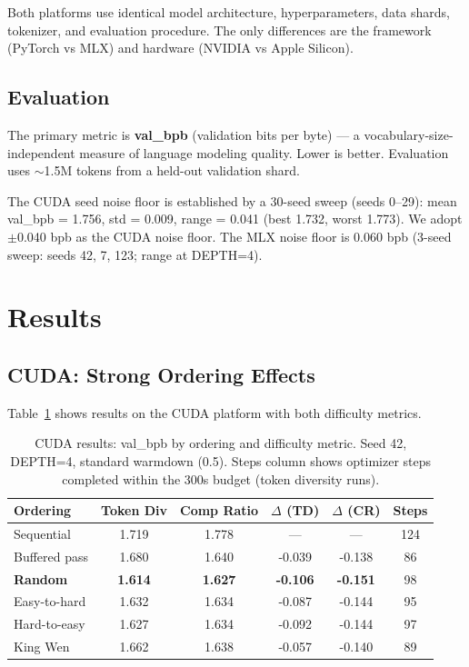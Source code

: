 \documentclass{article}
\begin{document}
Both platforms use identical model architecture, hyperparameters,
data shards, tokenizer, and evaluation procedure. The only differences
are the framework (PyTorch vs MLX) and hardware (NVIDIA vs Apple Silicon).

\subsection{Evaluation}

The primary metric is \textbf{val\_bpb} (validation bits per byte) ---
a vocabulary-size-independent measure of language modeling quality.
Lower is better. Evaluation uses $\sim$1.5M tokens from a held-out
validation shard.

The CUDA seed noise floor is established by a 30-seed sweep (seeds 0--29):
mean val\_bpb = 1.756, std = 0.009, range = 0.041 (best 1.732, worst 1.773).
We adopt $\pm$0.040 bpb as the CUDA noise floor.
The MLX noise floor is 0.060 bpb (3-seed sweep: seeds 42, 7, 123;
range at DEPTH=4).

\section{Results}\label{sec:results}

\subsection{CUDA: Strong Ordering Effects}

Table~\ref{tab:cuda} shows results on the CUDA platform with both
difficulty metrics.

\begin{table}[h]
\centering
\caption{CUDA results: val\_bpb by ordering and difficulty metric.
Seed 42, DEPTH=4, standard warmdown (0.5). Steps column shows
optimizer steps completed within the 300s budget (token diversity runs).}
\label{tab:cuda}
\begin{tabular}{lccccc}
\toprule
Ordering & Token Div & Comp Ratio & $\Delta$ (TD) & $\Delta$ (CR) & Steps \\
\midrule
Sequential       & 1.719 & 1.778 & ---    & ---    & 124 \\
Buffered pass    & 1.680 & 1.640 & -0.039 & -0.138 & 86 \\
\textbf{Random}  & \textbf{1.614} & \textbf{1.627} & \textbf{-0.106} & \textbf{-0.151} & 98 \\
Easy-to-hard     & 1.632 & 1.634 & -0.087 & -0.144 & 95 \\
Hard-to-easy     & 1.627 & 1.634 & -0.092 & -0.144 & 97 \\
King Wen         & 1.662 & 1.638 & -0.057 & -0.140 & 89 \\
\bottomrule
\end{tabular}
\end{table}
\end{document}
